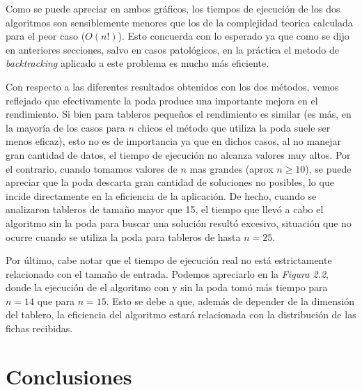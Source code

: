 \documentclass[a4paper,11pt] {article}
\begin{document}
% 

Como se puede apreciar en ambos gr\'aficos, los tiempos de ejecuci\'on de los dos algoritmos son sensiblemente menores que los de la complejidad teorica calculada para el peor caso ($O(n!)$). Esto concuerda con lo esperado ya que como se dijo en anteriores secciones, salvo en casos patol\'ogicos, en la pr\'actica el metodo de \textit{backtracking} aplicado a este problema es mucho m\'as eficiente.

Con respecto a las diferentes resultados obtenidos con los dos m\'etodos, vemos reflejado que efectivamente la poda produce una importante mejora en el rendimiento. Si bien para tableros peque\~{n}os el rendimiento es similar (es m\'as, en la mayor\'ia de los casos para $n$ chicos el m\'etodo que utiliza la poda suele ser menos eficaz), esto no es de importancia ya que en dichos casos, al no manejar gran cantidad de datos, el tiempo de ejecuci\'on no alcanza valores muy altos. Por el contrario, cuando tomamos valores de $n$ mas grandes (aprox $n\geq10$), se puede apreciar que la poda descarta gran cantidad de soluciones no posibles, lo que incide directamente en la eficiencia de la aplicaci\'on. De hecho, cuando se analizaron tableros de tama\~{n}o mayor que 15, el tiempo que llev\'o a cabo el algoritmo sin la poda para buscar una soluci\'on result\'o excesivo, situaci\'on que no ocurre cuando se utiliza la poda para tableros de hasta $n=25$.

Por \'ultimo, cabe notar que el tiempo de ejecuci\'on real no est\'a estrictamente relacionado con el tama\~{n}o de entrada. Podemos apreciarlo en la \textit{Figura 2.2}, donde la ejecuci\'on de el algoritmo con y sin la poda tom\'o m\'as tiempo para $n=14$ que para $n=15$. Esto se debe a que, adem\'as de depender de la dimensi\'on del tablero, la eficiencia del algoritmo estar\'a relacionada con la distribuci\'on de las fichas recibidas.

\section*{Conclusiones}
\end{document}
